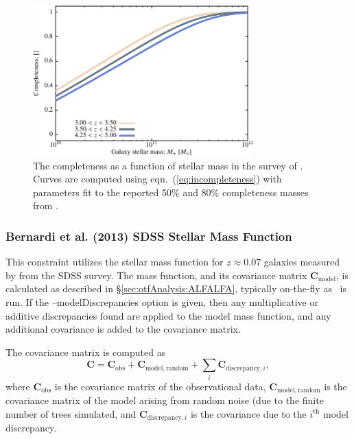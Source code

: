 \begin{figure}
 \begin{center}
 \includegraphics[width=85mm,trim=0mm 0mm 0mm 4mm,clip]{Plots/DataAnalysis/UKIDSSUDSCompleteness.pdf}
 \caption{The completeness as a function of stellar mass in the survey of \protect\cite{caputi_stellar_2011}. Curves are computed using eqn.~(\protect\ref{eq:incompleteness}) with parameters fit to the reported 50\% and 80\% completeness masses from \protect\cite{caputi_stellar_2011}.}
 \end{center}
 \label{fig:UKIDSSUDSCompleteness}
\end{figure}

\subsubsection{Bernardi et al. (2013) SDSS Stellar Mass Function}\label{sec:AnalysisBernardiSDSSStellarMassFunction}

This constraint utilizes the stellar mass function for $z\approx 0.07$ galaxies measured by \cite{bernardi_massive_2013} from the SDSS survey. The mass function, and its covariance matrix $\mathbf{C}_\mathrm{model}$, is calculated as described in \S\ref{sec:otfAnalysis:ALFALFA}, typically on-the-fly as \glc\ is run. If the {\normalfont \ttfamily --modelDiscrepancies} option is given, then any multiplicative or additive discrepancies found are applied to the model mass function, and any additional covariance is added to the covariance matrix.

The covariance matrix is computed as
\begin{equation}
 \mathbf{C} = \mathbf{C}_\mathrm{obs} + \mathbf{C}_\mathrm{model,random} + \sum_i \mathbf{C}_{\mathrm{discrepancy}, i},
\end{equation}
where $\mathbf{C}_\mathrm{obs}$ is the covariance matrix of the observational data, $\mathbf{C}_\mathrm{model,random}$ is the covariance matrix of the model arising from random noise (due to the finite number of trees simulated, and $\mathbf{C}_{\mathrm{discrepancy}, i}$ is the covariance due to the $i^\mathrm{th}$ model discrepancy.

